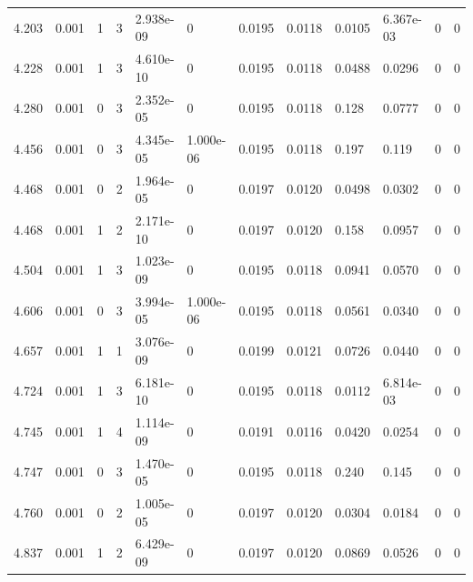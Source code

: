 \documentclass[preview]{standalone}
\begin{document}
{{{\begin{tabular}{L{1.2cm}C{1.2cm} C{0.3cm}C{0.5cm} C{1.4cm}C{1.4cm} C{1.4cm}C{1.4cm} C{1.6cm}C{1.6cm} C{1.6cm}C{1.6cm}}
  4.203  &  0.001  & 1     &  3 &  2.938e-09  & 0  &  0.0195&   0.0118& 0.0105 & 6.367e-03   &  0 & 0  \\ 
  4.228  &  0.001  & 1     &  3 &  4.610e-10  & 0  &  0.0195&   0.0118& 0.0488 & 0.0296   &  0 & 0  \\ 
  4.280  &  0.001  & 0     &  3 &  2.352e-05  & 0  &  0.0195&   0.0118& 0.128 & 0.0777   &  0 & 0  \\ 
  4.456  &  0.001  & 0     &  3 &  4.345e-05  & 1.000e-06  &  0.0195&   0.0118& 0.197 & 0.119   &  0 & 0  \\ 
  4.468  &  0.001  & 0     &  2 &  1.964e-05  & 0  &  0.0197&   0.0120& 0.0498 & 0.0302   &  0 & 0  \\ 
  4.468  &  0.001  & 1     &  2 &  2.171e-10  & 0  &  0.0197&   0.0120& 0.158 & 0.0957   &  0 & 0  \\ 
  4.504  &  0.001  & 1     &  3 &  1.023e-09  & 0  &  0.0195&   0.0118& 0.0941 & 0.0570   &  0 & 0  \\ 
  4.606  &  0.001  & 0     &  3 &  3.994e-05  & 1.000e-06  &  0.0195&   0.0118& 0.0561 & 0.0340   &  0 & 0  \\ 
  4.657  &  0.001  & 1     &  1 &  3.076e-09  & 0  &  0.0199&   0.0121& 0.0726 & 0.0440   &  0 & 0  \\ 
  4.724  &  0.001  & 1     &  3 &  6.181e-10  & 0  &  0.0195&   0.0118& 0.0112 & 6.814e-03   &  0 & 0  \\ 
  4.745  &  0.001  & 1     &  4 &  1.114e-09  & 0  &  0.0191&   0.0116& 0.0420 & 0.0254   &  0 & 0  \\ 
  4.747  &  0.001  & 0     &  3 &  1.470e-05  & 0  &  0.0195&   0.0118& 0.240 & 0.145   &  0 & 0  \\ 
  4.760  &  0.001  & 0     &  2 &  1.005e-05  & 0  &  0.0197&   0.0120& 0.0304 & 0.0184   &  0 & 0  \\ 
  4.837  &  0.001  & 1     &  2 &  6.429e-09  & 0  &  0.0197&   0.0120& 0.0869 & 0.0526   &  0 & 0  \\ 
\hline 
\end{tabular} 

}}}
\end{document}
